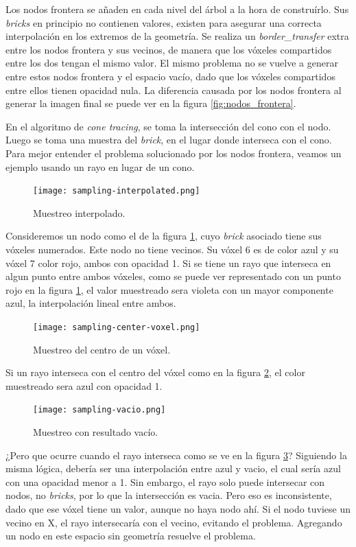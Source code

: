 Los nodos frontera se añaden en cada nivel del árbol a la hora de construírlo.
Sus \textit{bricks} en principio no contienen valores, existen para asegurar una correcta interpolación en los extremos de la geometría.
Se realiza un \textit{border\_transfer} extra entre los nodos frontera y sus vecinos, de manera que los vóxeles compartidos entre los dos tengan el mismo valor.
El mismo problema no se vuelve a generar entre estos nodos frontera y el espacio vacío, dado que los vóxeles compartidos entre ellos tienen opacidad nula.
La diferencia causada por los nodos frontera al generar la imagen final se puede ver en la figura \ref{fig:nodos_frontera}.

En el algoritmo de \textit{cone tracing}, se toma la intersección del cono con el nodo.
Luego se toma una muestra del \textit{brick}, en el lugar donde interseca con el cono.
Para mejor entender el problema solucionado por los nodos frontera, veamos un ejemplo usando un rayo en lugar de un cono.

\begin{figure}[h!]
    \centering
    \texttt{[image: sampling-interpolated.png]}
    \caption{Muestreo interpolado.}
    \label{fig:muestreo-interpolado}
\end{figure}

Consideremos un nodo como el de la figura \ref*{fig:muestreo-interpolado}, cuyo \textit{brick} asociado tiene sus vóxeles numerados.
Este nodo no tiene vecinos.
Su vóxel 6 es de color azul y su vóxel 7 color rojo, ambos con opacidad 1.
Si se tiene un rayo que interseca en algun punto entre ambos vóxeles, como se puede ver representado con un punto rojo en la figura \ref{fig:muestreo-interpolado}, el valor muestreado sera violeta con un mayor componente azul, la interpolación lineal entre ambos.

\begin{figure}[h!]
    \centering
    \texttt{[image: sampling-center-voxel.png]}
    \caption{Muestreo del centro de un vóxel.}
    \label{fig:muestreo-centro-voxel}
\end{figure}

Si un rayo interseca con el centro del vóxel como en la figura \ref{fig:muestreo-centro-voxel}, el color muestreado sera azul con opacidad 1.
\begin{figure}[h!]
    \centering
    \texttt{[image: sampling-vacio.png]}
    \caption{Muestreo con resultado vacío.}
    \label{fig:muestreo-vacio}
\end{figure}

¿Pero que ocurre cuando el rayo interseca como se ve en la figura \ref{fig:muestreo-vacio}?
Siguiendo la misma lógica, debería ser una interpolación entre azul y vacio, el cual sería azul con una opacidad menor a 1.
Sin embargo, el rayo solo puede intersecar con nodos, no \textit{bricks}, por lo que la intersección es vacia.
Pero eso es inconsistente, dado que ese vóxel tiene un valor, aunque no haya nodo ahí.
Si el nodo tuviese un vecino en X, el rayo intersecaría con el vecino, evitando el problema.
Agregando un nodo en este espacio sin geometría resuelve el problema.

